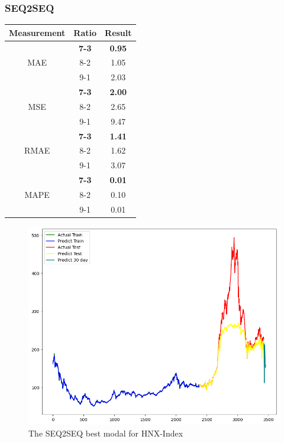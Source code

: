 \documentclass{ieeeojies}
\begin{document}
\subsubsection{SEQ2SEQ}
\begin{table}[H]
    \centering
    \begin{tabular}{|c|c|c|}
        \hline
         Measurement & Ratio &  Result  \\
        \hline
             & \textbf{7-3} & \textbf{0.95} \\
        MAE  & 8-2 & 1.05  \\
            & 9-1 & 2.03 \\
        \hline
           &\textbf{ 7-3 }& \textbf{2.00}  \\
        MSE  & 8-2 & 2.65 \\
            & 9-1 & 9.47  \\
        \hline
           & \textbf{7-3} & \textbf{1.41} \\
        RMAE  & 8-2 & 1.62  \\
            & 9-1 & 3.07 \\
        \hline
           &\textbf{ 7-3} & \textbf{0.01}  \\
        MAPE  & 8-2 & 0.10  \\
            & 9-1 & 0.01 \\
        \hline
    \end{tabular}
    \label{table:example}
\end{table}
\begin{figure}[H]
    \centering
    \includegraphics[width=0.8\linewidth]{RE HNX 73.jpg}
    \caption{The SEQ2SEQ best modal for HNX-Index}
    \label{fig:example}
\end{figure}
\end{document}
